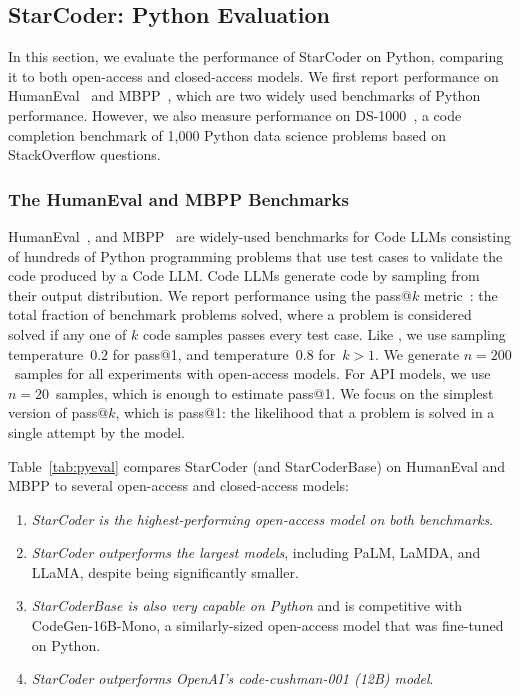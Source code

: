 \subsection{StarCoder: Python Evaluation}

In this section, we evaluate the performance of StarCoder on Python, comparing it to both open-access and closed-access models. We first report performance on HumanEval~\citep{chen2021codex} and MBPP~\citep{austin2021program}, which are two widely used benchmarks of Python performance. However, we also measure performance on DS-1000~\citep{Lai2022DS1000}, a code completion benchmark of 1,000 Python data science problems based on StackOverflow questions.

\subsubsection{The HumanEval and MBPP Benchmarks}

HumanEval~\citep{chen2021codex}, and MBPP~\citep{austin2021program} are widely-used benchmarks for Code LLMs consisting of hundreds of Python programming problems that use test cases to validate the code produced by a Code LLM. Code LLMs generate code by sampling from their output distribution. We report performance using the pass@$k$ metric~\citep{chen2021codex}: the total fraction of benchmark problems solved, where a problem is considered solved if any one of $k$ code samples passes every test case. Like \citet{chen2021codex}, we use sampling temperature~$0.2$ for pass@1, and temperature~$0.8$ for~$k > 1$. We generate $n=200$~samples for all experiments with open-access models. For API models, we use $n=20$~samples, which is enough to estimate pass@1. We focus on the simplest version of pass@$k$, which is pass@1: the likelihood that a problem is solved in a single attempt by the model.

Table~\ref{tab:pyeval} compares StarCoder (and StarCoderBase) on HumanEval and MBPP to several open-access and closed-access models:

\begin{enumerate}

  \item \emph{StarCoder is the highest-performing open-access model on both benchmarks}.
   \item \emph{StarCoder outperforms the largest models}, including PaLM, LaMDA, and LLaMA, despite being significantly smaller.

   \item \emph{StarCoderBase is also very capable on Python} and is competitive with CodeGen-16B-Mono, a similarly-sized open-access model that was fine-tuned on Python. 

   \item \emph{StarCoder outperforms OpenAI's code-cushman-001 (12B) model}.

\end{enumerate}

